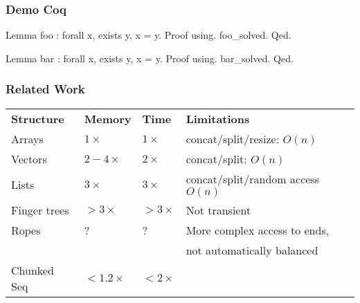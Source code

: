 \begin{frame}[fragile]
\frametitle{Demo Coq}

\begin{coq}
  Lemma foo : forall x, exists y, x = y.
  Proof using.
    foo_solved.
  Qed.
\end{coq}

\begin{coqs}
  Lemma bar : forall x, exists y, x = y.
  Proof using.
    bar_solved.
  Qed.
\end{coqs}

\end{frame}


\begin{frame}[fragile]
\frametitle{Related Work}

\begin{tabular}{llll}
 \textbf{Structure} & \textbf{Memory} & \textbf{Time} & \textbf{Limitations}\\
Arrays & $1\times$ & $1\times$ & concat/split/resize: $O(n)$ \\
Vectors & $2-4\times$ & $2\times$ & concat/split: $O(n)$\\
Lists & $3\times$ & $3\times$ & concat/split/random access $O(n)$\\
Finger trees & $>3\times$ & $>3\times$ & Not transient\\
Ropes & ? & ? & More complex access to ends, \\
& & & not automatically balanced\\
Chunked Seq & $<1.2 \times$ & $<2 \times$ &
\end{tabular}

\end{frame}

